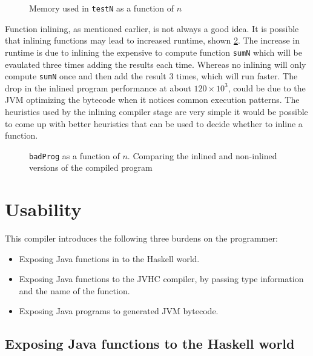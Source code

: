 \documentclass[float=false, crop=false]{standalone}
\newlength\gwidth
\newlength\gheight
\newcommand{\importMGraph}[3]{\setlength{\gwidth}{#2}\setlength{\gheight}{#3}{#1}}
\begin{document}
\begin{figure}
  \centering
  \importMGraph{memUsed}{0.96\textwidth}{0.3\textwidth}
  \caption{Memory used in \texttt{testN} as a function of $n$}
  \label{plot:memUsed}
\end{figure}
Function inlining, as mentioned earlier, is not always a good idea.
It is possible that inlining functions may lead to increased runtime, shown  
\cref{plot:badInline}. 
The increase in runtime is due to inlining the expensive to compute function 
\texttt{sumN} which will be evaulated three times adding the results each time. 
Whereas no inlining will only compute \texttt{sumN} once and then add the result 3 times, 
which will run faster. The drop in the inlined program performance at about $120 \times 10^3$, 
could be due to the JVM optimizing the bytecode when it notices common execution patterns.
The heuristics used by the inlining compiler stage are very simple it would be possible to 
come up with better heuristics that can be used to decide whether to inline a function.

\begin{figure}
  \centering
  \importMGraph{plotBadInline}{0.96\textwidth}{0.3\textwidth}
  \caption{\texttt{badProg} as a function of $n$. Comparing the inlined and non-inlined
  versions of the compiled program}
    \label{plot:badInline}
\end{figure}

\section{Usability}

This compiler introduces the following three burdens on the programmer:

\begin{itemize}
  \item Exposing Java functions in to the Haskell world.

  \item Exposing Java functions to the JVHC compiler, by passing type information and the name 
    of the function.

  \item Exposing Java programs to generated JVM bytecode.
\end{itemize}

\subsection{Exposing Java functions to the Haskell world}
\end{document}
